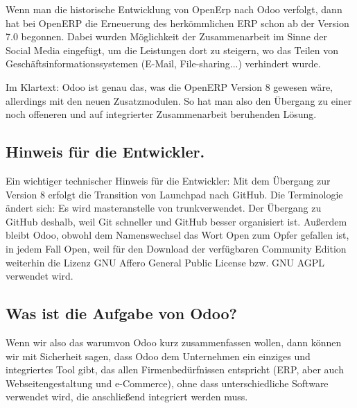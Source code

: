 Wenn man die historische Entwicklung von OpenErp nach Odoo verfolgt, dann hat bei OpenERP die Erneuerung des herkömmlichen ERP schon ab der Version 7.0 begonnen. Dabei wurden Möglichkeit der Zusammenarbeit im Sinne der Social Media eingefügt, um die Leistungen dort zu steigern, wo das Teilen von Geschäftsinformationssystemen (E-Mail, File-sharing...) verhindert wurde.

Im Klartext: Odoo ist genau das, was die OpenERP Version 8 gewesen wäre, allerdings mit den neuen Zusatzmodulen. So hat man also den Übergang zu einer noch offeneren und auf integrierter Zusammenarbeit beruhenden Lösung.
\subsection{Hinweis für die Entwickler.}
Ein wichtiger technischer Hinweis für die Entwickler: Mit dem Übergang zur Version 8 erfolgt die Transition von Launchpad nach GitHub. Die Terminologie ändert sich: Es wird \glqq master\grqq \space anstelle von \glqq trunk\grqq \space verwendet. Der Übergang zu GitHub deshalb, weil Git schneller und GitHub besser organisiert ist. Außerdem bleibt Odoo, obwohl dem Namenswechsel das Wort Open zum Opfer gefallen ist, in jedem Fall Open, weil für den Download der verfügbaren Community Edition weiterhin die Lizenz GNU Affero General Public License bzw. GNU AGPL verwendet wird.
\subsection{Was ist die Aufgabe von Odoo?}
Wenn wir also das \glqq warum\grqq \space von Odoo kurz zusammenfassen wollen, dann können wir mit Sicherheit sagen, dass Odoo dem Unternehmen ein einziges und integriertes Tool gibt, das allen Firmenbedürfnissen entspricht (ERP, aber auch Webseitengestaltung und e-Commerce), ohne dass unterschiedliche Software verwendet wird, die anschließend integriert werden muss.
